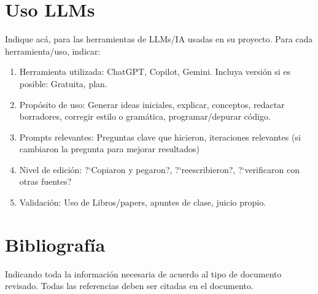 \documentclass[letter, 10pt]{article}
\begin{document}
\section{Uso LLMs}
Indique ac\'a, para las herramientas de LLMs/IA usadas en su proyecto. Para cada herramienta/uso, indicar:
\begin{enumerate}
\item Herramienta utilizada: ChatGPT, Copilot, Gemini. Incluya versi\'on si es posible: Gratuita, plan.
\item Prop\'osito de uso: Generar ideas iniciales, explicar,  conceptos, redactar borradores, corregir estilo o gram\'atica, programar/depurar c\'odigo.
\item Prompts relevantes: Preguntas clave que hicieron, iteraciones relevantes (si cambiaron la pregunta para mejorar resultados)
\item Nivel de edici\'on: ?`Copiaron y pegaron?, ?`reescribieron?, ?`verificaron con otras fuentes?
\item Validaci\'on: Uso de Libros/papers, apuntes de clase, juicio propio.
\end{enumerate}


\section{Bibliograf\'ia}
Indicando toda la informaci\'on necesaria de acuerdo al tipo de documento revisado. Todas las referencias deben ser citadas en el documento.


\end{document}
